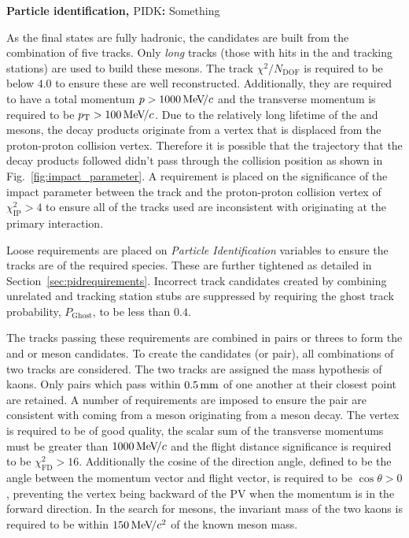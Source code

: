 \begin{description}
\item \textbf{Particle identification, $\text{PIDK}$:} {\color{red} Something }  
\end{description}


As the final states are fully hadronic, the candidates are built from the combination of five tracks. Only \emph{long} tracks (those with hits in the \velo and tracking stations) are used to build these mesons. The track $\chi^{2}/N_{\text{DOF}}$ is required to be below $4.0$ to ensure these are well reconstructed. Additionally, they are required to have a total momentum $\mbox{$p$} > 1000 {\mathrm{\,Me\kern -0.1em V\!/}c}$ and the transverse momentum is required to be $\mbox{$p_{\mathrm{ T}}$} > 100 {\mathrm{\,Me\kern -0.1em V\!/}c}$.
Due to the relatively long lifetime of the \Bp and \D mesons, the decay products originate from a vertex that is displaced from the proton-proton collision vertex. Therefore it is possible that the trajectory that the decay products followed didn't pass through the collision position as shown in Fig.~\ref{fig:impact_parameter}. A requirement is placed on the significance of the impact parameter between the track and the proton-proton collision vertex of $\chi^{2}_{\text{IP}} > 4$ to ensure all of the tracks used are inconsistent with originating at the primary interaction.  


Loose requirements are placed on \emph{Particle Identification} variables to ensure the tracks are of the required species. These are further tightened as detailed in Section~\ref{sec:pidrequirements}. Incorrect track candidates created by combining unrelated \velo and tracking station {\color{red}stubs} are suppressed by requiring the ghost track probability, $P_{\text{Ghost}}$, to be less than $0.4$. 


The tracks passing these requirements are combined in pairs or threes to form the \Dsp and \phiz or \Dzb meson candidates.  
To create the \phiz candidates (or \Kp\Km pair), all combinations of two tracks are considered. The two tracks are assigned the mass hypothesis of kaons. Only pairs which pass within $0.5\mathrm{ \,mm}$ of one another at their closest point are retained. A number of requirements are imposed to ensure the pair are consistent with coming from a \phiz meson originating from a \Bp meson decay. The vertex is required to be of good quality, the scalar sum of the transverse momentums must be greater than $1000{\mathrm{\,Me\kern -0.1em V\!/}c}$ and the flight distance significance is required to be $\chi^{2}_{\text{FD} } > 16$. Additionally the cosine of the direction angle, defined to be the angle between the momentum vector and flight vector, is required to be $\cos{\theta}>0$, preventing the vertex being backward of the PV when the momentum is in the forward direction. In the search for \decay{\Bp}{\Dsp\phiz} mesons, the invariant mass of the two kaons is required to be within $150{\mathrm{\,Me\kern -0.1em V\!/}c^2}$ of the known \phiz meson mass.  

